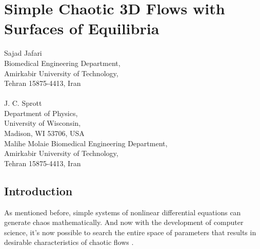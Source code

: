 \chapter{Simple Chaotic 3D Flows with Surfaces of Equilibria}
\label{chap:sur_equi}
\begin{pauthor}
  Sajad Jafari\\
  Biomedical Engineering Department,\\
  Amirkabir University of Technology,\\
  Tehran 15875-4413, Iran\\
  \\
  J. C. Sprott\\
  Department of Physics, \\
  University of Wisconsin, \\
  Madison, WI 53706, USA \\
  Malihe Molaie Biomedical Engineering Department, \\
  Amirkabir University of Technology, \\
  Tehran 15875-4413, Iran
\end{pauthor}


\section{Introduction}
\label{sec:org110e565}

As mentioned before, simple systems of nonlinear differential
equations can generate chaos mathematically.
And now with the development of computer science, it's now possible to search
the entire space of parameters that results in desirable characteristics
of chaotic flows \cite{01_Sprott2010Elegant}.

